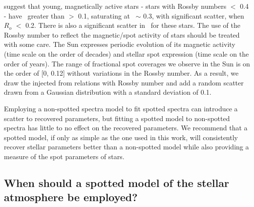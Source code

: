 \citet{cao_starspots_2022} suggest that young, magnetically active stars - stars with Rossby numbers $<$ 0.4 - have \fspot\ greater than $>$ 0.1, saturating at \fspot\ $\sim$ 0.3, with significant scatter, when $R_o$ $<$ 0.2. 
There is also a significant scatter in \fspot\ for these stars. The use of the Rossby number to reflect the magnetic/spot activity of stars should be treated with some care. The Sun expresses periodic evolution of its magnetic activity (time scale on the order of decades) and stellar spot expression (time scale on the order of years). The range of fractional spot coverages we observe in the Sun is on the order of [0, 0.12] without variations in the Rossby number. As a result, we draw the injected \fspot from relations with Rossby number and add a random scatter drawn from a Gaussian distribution with a standard deviation of 0.1.

Employing a non-spotted spectra model to fit spotted spectra can introduce a scatter to recovered parameters, but fitting a spotted model to non-spotted spectra has little to no effect on the recovered parameters.
We recommend that a spotted model, if only as simple as the one used in this work, will consistently recover stellar parameters better than a non-spotted model while also providing a measure of the spot parameters of stars.


\subsection{When should a spotted model of the stellar atmosphere be employed?}




